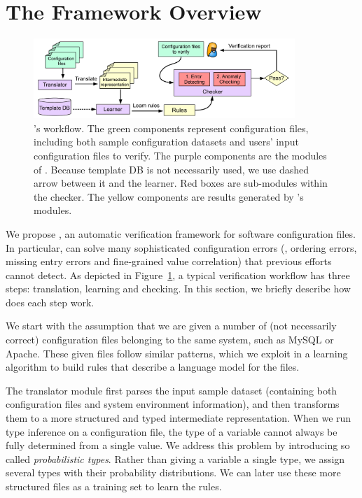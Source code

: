 
\section{The \app Framework Overview}

\begin{figure}[tbp] \centering
\includegraphics[width=0.88\textwidth]{figs/overview}
\caption{\app's workflow. The green components represent configuration 
  files, including both sample configuration datasets and users' input
  configuration files to verify. 
  The purple components are the modules of \app.
  Because template DB is not necessarily used, we use dashed
  arrow between it and the learner.
  Red boxes are sub-modules within the checker.
  The yellow components are results generated by \app's modules.}
\label{fig-overview}
\end{figure}

We propose \app, an automatic verification framework for 
software configuration files.
In particular, \app can solve many sophisticated 
configuration errors (\eg, ordering errors, missing entry errors 
and fine-grained value correlation) that previous efforts cannot 
detect. As depicted in Figure~\ref{fig-overview}, 
a typical \app verification workflow has three steps:
translation, learning and checking. In this section, we briefly
describe how does each step work.

We start with the assumption 
that we are given a number of (not necessarily correct) 
configuration files belonging to the same system, 
such as MySQL or Apache. 
These given files follow similar patterns, which we exploit
in a learning algorithm to build rules that
describe a language model for the files.

The translator module first parses the input sample 
dataset (containing both configuration files and system environment
information), and then transforms them to a more structured
and typed intermediate representation.
When we run type inference on a configuration file, 
the type of a variable cannot always be fully determined from 
a single value.
We address this problem 
by introducing so called {\em probabilistic types}.
Rather than giving a variable a single type, 
we assign several types with their probability distributions. 
We can later use these more structured files
as a training set to learn the rules. 

